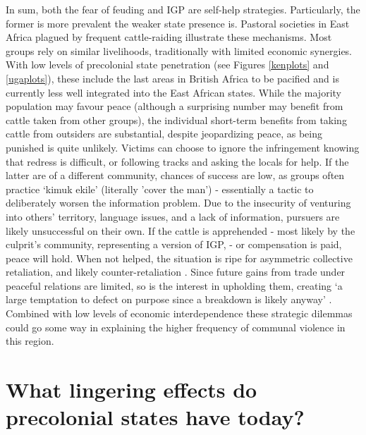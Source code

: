 In sum, both the fear of feuding and IGP are self-help strategies. Particularly,
the former is more prevalent the weaker state presence is. Pastoral societies in
East Africa plagued by frequent cattle-raiding illustrate these mechanisms. Most
groups rely on similar livelihoods, traditionally with limited economic
synergies. With low levels of precolonial state penetration (see Figures
\ref{kenplots} and \ref{ugaplots}), these include the last areas in British
Africa to be pacified \citep{Lamphear1992} and is currently less well
integrated into the East African states. While the majority population may
favour peace (although a surprising number may benefit from cattle taken from
other groups), the individual short-term benefits from taking cattle from
outsiders are substantial, despite jeopardizing peace, as being punished is
quite unlikely. Victims can choose to ignore the infringement knowing that
redress is difficult, or following tracks and asking the locals for help. If the
latter are of a different community, chances of success are low, as groups often
practice `kimuk ekile' (literally 'cover the man') - essentially a tactic to
deliberately worsen the information problem. Due to the insecurity of venturing
into others’ territory, language issues, and a lack of information, pursuers are
likely unsuccessful on their own. If the cattle is apprehended - most likely by
the culprit's community, representing a version of IGP, - or compensation is
paid, peace will hold. When not helped, the situation is ripe for asymmetric
collective retaliation, and likely counter-retaliation
\citep[104ff]{Eaton_2008}. Since future gains from trade under peaceful
relations are limited, so is the interest in upholding them, creating ‘a large
temptation to defect on purpose since a breakdown is likely anyway’
\citep[724]{Fearon_1996}. Combined with low levels of economic interdependence
these strategic dilemmas could go some way in explaining the higher frequency of
communal violence in this region. 







 
\section{What lingering effects do precolonial states have today?}
\label{What lingering effects do precolonial states have today?}

